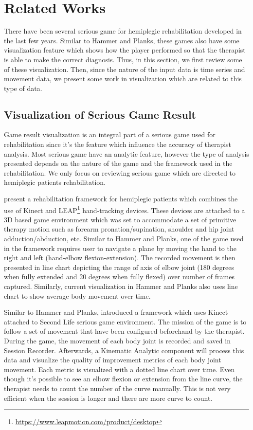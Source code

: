 \documentclass{vgtc}                          %
\begin{document}
\section{Related Works}
There have been several serious game for hemiplegic rehabilitation developed in the last few years. Similar to Hammer and Planks, these games also have some visualization feature which shows how the player performed so that the therapist is able to make the correct diagnosis. Thus, in this section, we first review some of these visualization. Then, since the nature of the input data is time series and movement data, we present some work in visualization which are related to this type of data.

\subsection{Visualization of Serious Game Result} 

Game result visualization is an integral part of a serious game used for rehabilitation since it's the feature which influence the accuracy of therapist analysis. Most serious game have an analytic feature, however the type of analysis presented depends on the nature of the game and the framework used in the rehabilitation. We only focus on reviewing serious game which are directed to hemiplegic patients rehabilitation.

\cite{rahman} present a rehabilitation framework for hemiplegic patients which combines the use of Kinect and LEAP\footnote{\url{https://www.leapmotion.com/product/desktop}} hand-tracking devices. These devices are attached to a 3D based game environment which was set to accommodate a set of primitive therapy motion such as forearm pronation/supination, shoulder and hip joint adduction/abduction, etc. Similar to Hammer and Planks, one of the game used in the framework requires user to navigate a plane by moving the hand to the right and left (hand-elbow flexion-extension). The recorded movement is then presented in line chart depicting the range of axis of elbow joint (180 degrees when fully extended and 20 degrees when fully flexed) over number of frames captured. Similarly, current visualization in Hammer and Planks also uses line chart to show average body movement over time. 

Similar to Hammer and Planks, \cite{rahman2} introduced a framework which uses Kinect attached to Second Life serious game environment. The mission of the game is to follow a set of movement that have been configured beforehand by the therapist. During the game, the movement of each body joint  is recorded and saved in Session Recorder. Afterwards, a Kinematic Analytic component will process this data and visualize the quality of improvement metrics of each body joint movement. Each metric is visualized with a dotted line chart over time. Even though it's possible to  see an elbow flexion or extension from the line curve, the therapist needs to count the number of the curve manually. This is not very efficient when the session is longer and there are more curve to count.
\end{document}
